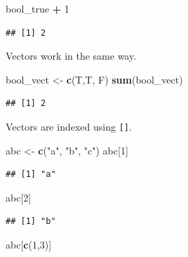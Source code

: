 \documentclass[openany]{book}
\newenvironment{Shaded}{\begin{snugshade}}{\end{snugshade}}
\newcommand{\DecValTok}[1]{\textcolor[rgb]{0.00,0.00,0.81}{#1}}
\newcommand{\KeywordTok}[1]{\textcolor[rgb]{0.13,0.29,0.53}{\textbf{#1}}}
\newcommand{\NormalTok}[1]{#1}
\newcommand{\OperatorTok}[1]{\textcolor[rgb]{0.81,0.36,0.00}{\textbf{#1}}}
\newcommand{\StringTok}[1]{\textcolor[rgb]{0.31,0.60,0.02}{#1}}
\begin{document}
\begin{Shaded}
\begin{Highlighting}[]
\NormalTok{bool_true }\OperatorTok{+}\StringTok{ }\DecValTok{1}
\end{Highlighting}
\end{Shaded}

\begin{verbatim}
## [1] 2
\end{verbatim}

Vectors work in the same way.

\begin{Shaded}
\begin{Highlighting}[]
\NormalTok{bool_vect <-}\StringTok{ }\KeywordTok{c}\NormalTok{(T,T, F)}
\KeywordTok{sum}\NormalTok{(bool_vect)}
\end{Highlighting}
\end{Shaded}

\begin{verbatim}
## [1] 2
\end{verbatim}

Vectors are indexed using \texttt{{[}{]}}.

\begin{Shaded}
\begin{Highlighting}[]
\NormalTok{abc <-}\StringTok{ }\KeywordTok{c}\NormalTok{(}\StringTok{"a"}\NormalTok{, }\StringTok{"b"}\NormalTok{, }\StringTok{"c"}\NormalTok{)}
\NormalTok{abc[}\DecValTok{1}\NormalTok{]}
\end{Highlighting}
\end{Shaded}

\begin{verbatim}
## [1] "a"
\end{verbatim}

\begin{Shaded}
\begin{Highlighting}[]
\NormalTok{abc[}\DecValTok{2}\NormalTok{]}
\end{Highlighting}
\end{Shaded}

\begin{verbatim}
## [1] "b"
\end{verbatim}

\begin{Shaded}
\begin{Highlighting}[]
\NormalTok{abc[}\KeywordTok{c}\NormalTok{(}\DecValTok{1}\NormalTok{,}\DecValTok{3}\NormalTok{)]}
\end{Highlighting}
\end{Shaded}
\end{document}
